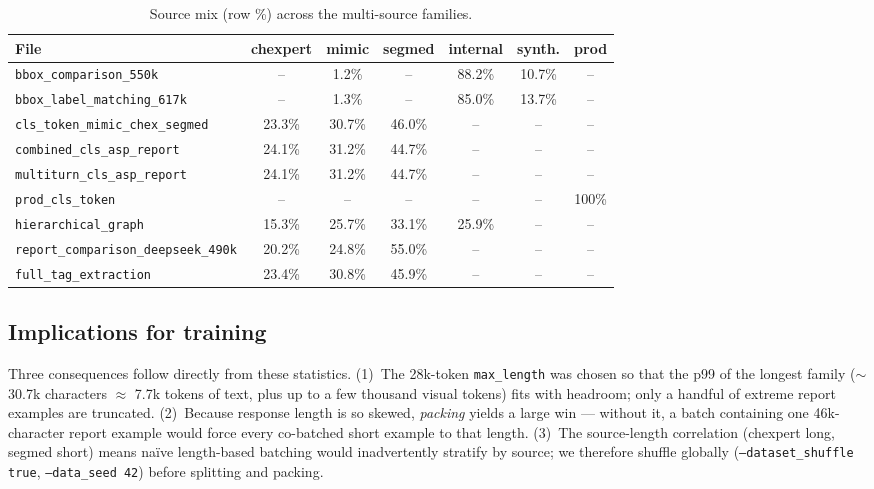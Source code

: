 \documentclass[11pt,a4paper]{article}
\begin{document}
\begin{table}[H]
\centering\footnotesize
\caption{Source mix (row \%) across the multi-source families.}
\label{tab:source}
\begin{tabularx}{\textwidth}{L c c c c c c}
\toprule
\textbf{File} & \textbf{chexpert} & \textbf{mimic} & \textbf{segmed} & \textbf{internal} & \textbf{synth.} & \textbf{prod} \\
\midrule
\texttt{bbox\_comparison\_550k} & -- & 1.2\% & -- & 88.2\% & 10.7\% & -- \\
\texttt{bbox\_label\_matching\_617k} & -- & 1.3\% & -- & 85.0\% & 13.7\% & -- \\
\texttt{cls\_token\_mimic\_chex\_segmed} & 23.3\% & 30.7\% & 46.0\% & -- & -- & -- \\
\texttt{combined\_cls\_asp\_report} & 24.1\% & 31.2\% & 44.7\% & -- & -- & -- \\
\texttt{multiturn\_cls\_asp\_report} & 24.1\% & 31.2\% & 44.7\% & -- & -- & -- \\
\texttt{prod\_cls\_token} & -- & -- & -- & -- & -- & 100\% \\
\texttt{hierarchical\_graph} & 15.3\% & 25.7\% & 33.1\% & 25.9\% & -- & -- \\
\texttt{report\_comparison\_deepseek\_490k} & 20.2\% & 24.8\% & 55.0\% & -- & -- & -- \\
\texttt{full\_tag\_extraction} & 23.4\% & 30.8\% & 45.9\% & -- & -- & -- \\
\bottomrule
\end{tabularx}
\end{table}

\subsection{Implications for training}
Three consequences follow directly from these statistics. (1)~The 28k-token \texttt{max\_length} was chosen so that the p99 of the longest family ($\sim$30.7k characters $\approx$ 7.7k tokens of text, plus up to a few thousand visual tokens) fits with headroom; only a handful of extreme report examples are truncated. (2)~Because response length is so skewed, \emph{packing} yields a large win --- without it, a batch containing one 46k-character report example would force every co-batched short example to that length. (3)~The source-length correlation (chexpert long, segmed short) means naïve length-based batching would inadvertently stratify by source; we therefore shuffle globally (\texttt{--dataset\_shuffle true}, \texttt{--data\_seed 42}) before splitting and packing.
\end{document}
